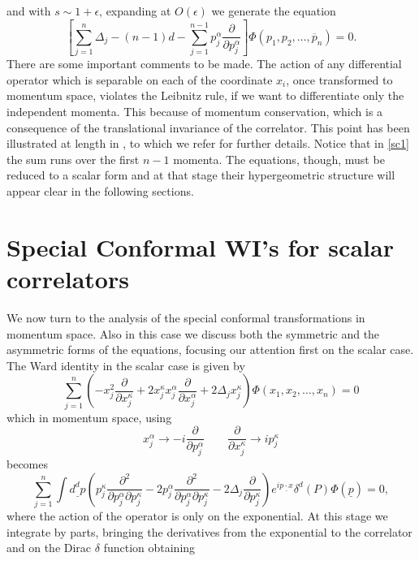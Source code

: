 \documentclass[a4paper,11pt,openright,twoside]{book}
\numberwithin{equation}{section}
\begin{document}
and with $s\sim 1 +\epsilon$, expanding at $O(\epsilon)$ we generate the equation 
\begin{equation}
	\label{sc1}
	\left[\sum_{j=1}^n \Delta_j  -(n-1) d -\sum_{j=1}^{n-1}p_j^\alpha \frac{\partial}{\partial p_j^\alpha}\right]
	\Phi(p_1,p_2,\ldots,\overline{p}_n)=0.
\end{equation}
There are some important comments to be made. The action of any differential 
operator which is separable on each of the coordinate $x_i$, once transformed to momentum space, violates the Leibnitz rule, if we want to differentiate only the independent momenta. This because of momentum conservation, which is a consequence of the translational invariance of the correlator. This point has been illustrated at length in \cite{Coriano:2018bbe}, to which we refer for further details. Notice that in \eqref{sc1} the sum runs over the first $n-1$ momenta. The equations, though, must be reduced to a scalar form and at that stage their hypergeometric structure \cite{Coriano:2013jba,Bzowski:2013sza} will appear clear in the following sections.

\section{Special Conformal WI's for scalar correlators}\label{specialMom}
We now turn to the analysis of the special conformal transformations in momentum space. 
Also in this case we discuss both the symmetric and the asymmetric forms of the equations, focusing our attention first on the scalar case. 
The Ward identity in the scalar case is given by
\begin{equation}
	\sum_{j=1}^{n} \left(- x_j^2\frac{\partial}{\partial x_j^\kappa}+ 2 x_j^\kappa x_j^\alpha \frac{\partial}
	{\partial x_j^\alpha} +2 \Delta_j x_j^\kappa\right)\Phi(x_1,x_2,\ldots,x_n) =0
\end{equation}
which in momentum space, using 
\begin{equation}
	x_j^\alpha\to -i \frac{\partial}{\partial p_j^\alpha} \qquad \frac{\partial}{\partial x_j^\kappa}\to i p_j^\kappa
\end{equation}
becomes 
\begin{equation}
	\sum_{j=1}^n \int \underline {d^d p}\left(p_j^\kappa \frac{\partial^2}{\partial p_j^\alpha \partial p_j^\kappa} -
	2 p_j^\alpha \frac{\partial^2}{\partial p_j^\alpha \partial p_j^\kappa}  -2 \Delta_j\frac{\partial}{\partial p_j^\kappa}\right) 
	e^{i\underline{p\cdot x}} \delta^d(P)\Phi(\underline{p})=0,
\end{equation}
where the action of the operator is only on the exponential. At this stage we integrate by parts, bringing the derivatives from the exponential to the correlator and on the Dirac $\delta$ function obtaining 
\end{document}
